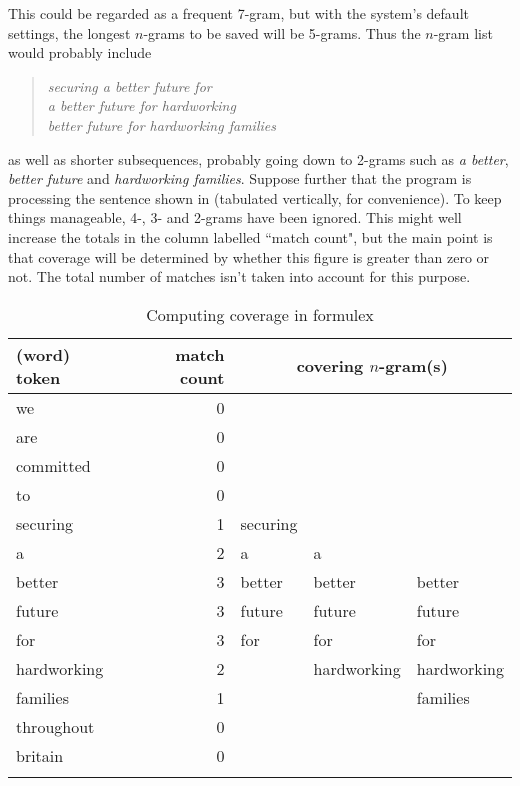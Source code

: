 \documentclass[output=paper]{langscibook}
\begin{document}
This could be regarded as a frequent 7-gram, but with the system's default settings, the longest $n$-grams to be saved will be 5-grams. Thus the $n$-gram list would probably include

\begin{quote}
\textit{securing a better future for}\\
\textit{a better future for hardworking}\\
\textit{better future for hardworking families}
\end{quote}
as well as shorter subsequences, probably going down to 2-grams such as \textit{a better}, \textit{better future} and \textit{hardworking families}. Suppose further that the program is processing the sentence shown in  (tabulated vertically, for convenience).
To keep things manageable, 4-, 3- and 2-grams have been ignored. This might well increase the totals in the column labelled ``match count", but the main point is that coverage will be determined by whether this figure is greater than zero or not. The total number of matches isn't taken into account for this purpose.

\begin{table}
\caption{Computing coverage in formulex\label{tab:forsyth:4}}
\begin{tabularx}{\textwidth}{Xrlll}
\lsptoprule
(word) token & match count & \multicolumn{3}{c}{covering $n$-gram(s)}\\\midrule
we          & 0 &  &  & \\
are         & 0 &  &  & \\
committed   & 0 &  &  & \\
to          & 0 &  &  & \\
securing    & 1 & securing &  & \\
a           & 2 & a & a & \\
better      & 3 & better & better & better\\
future      & 3 & future & future & future\\
for         & 3 & for & for & for\\
hardworking & 2 &  & hardworking & hardworking\\
families    & 1 &  &  & families\\
throughout  & 0 &  &  & \\
britain     & 0 &  &  & \\
\lspbottomrule
\end{tabularx}
\end{table}
\end{document}
